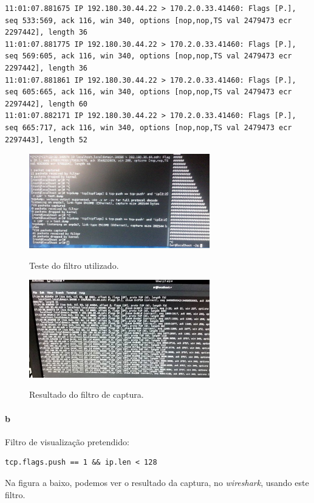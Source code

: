\begin{verbatim}
11:01:07.881675 IP 192.180.30.44.22 > 170.2.0.33.41460: Flags [P.], seq 533:569, ack 116, win 340, options [nop,nop,TS val 2479473 ecr 2297442], length 36
11:01:07.881775 IP 192.180.30.44.22 > 170.2.0.33.41460: Flags [P.], seq 569:605, ack 116, win 340, options [nop,nop,TS val 2479473 ecr 2297442], length 36
11:01:07.881861 IP 192.180.30.44.22 > 170.2.0.33.41460: Flags [P.], seq 605:665, ack 116, win 340, options [nop,nop,TS val 2479473 ecr 2297442], length 60
11:01:07.882171 IP 192.180.30.44.22 > 170.2.0.33.41460: Flags [P.], seq 665:717, ack 116, win 340, options [nop,nop,TS val 2479473 ecr 2297443], length 52
\end{verbatim}

\begin{figure}[h]
\centering
\includegraphics[width=0.7\textwidth]{3_a_filtro.png}
\label{fig:filtro}
\caption{Teste do filtro utilizado.}
\end{figure}

\begin{figure}[h]
\centering
\includegraphics[width=0.7\textwidth]{3_a_resultado_do_tcpdump.png}
\label{fig:tcpdump}
\caption{Resultado do filtro de captura.}
\end{figure}

\paragraph{b}
Filtro de visualização pretendido:
\begin{verbatim}
tcp.flags.push == 1 && ip.len < 128
\end{verbatim}
Na figura a baixo, podemos ver o resultado da captura, no \emph{wireshark}, usando este filtro.

